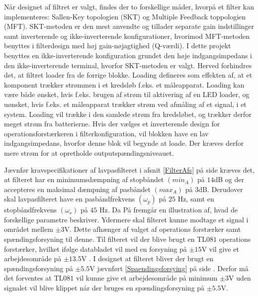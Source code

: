 Når designet af filtret er valgt, findes der to forskellige måder, hvorpå et filter kan implementeres: Sallen-Key topologien (SKT) og Multiple Feedback toppologien (MFT). SKT-metoden er den mest anvendte og tillader separate gain indstillinger samt inverterende og ikke-inverterende konfigurationer, hvorimod MFT-metoden benyttes i filterdesign med høj gain-nøjagtighed (Q-værdi). I dette projekt benyttes en ikke-inverterende konfiguration grundet den høje indgangsimpedans i den ikke-inverterende terminal, hvorfor SKT-metoden er valgt. Herved forhindres det, at filtret loader fra de forrige blokke. Loading defineres som effekten af, at et komponent trækker strømmen i et kredsløb f.eks. et måleapparat. Loading kan være både ønsket, hvis f.eks. brugen af strøm til aktivering af en LED loader, og uønsket, hvis f.eks. et måleapparat trækker strøm ved afmåling af et signal, i et system. Loading vil trække i den samlede strøm fra kredsløbet, og trækker derfor meget strøm fra batterierne. Hvis der vælges et inverterende design for operationsforstærkeren i filterkonfiguration, vil blokken have en lav indgangsimpedans, hvorfor denne blok vil begynde at loade. Der kræves derfor mere strøm for at opretholde outputspændingsniveauet. \cite{Webster2009,Carter2013,Karni2014}

Jævnfør kravspecifikationer af lavpasfilteret i afsnit \ref{FilterAfs} på side \pageref{FilterAfs} kræves det, at filteret har en minimumsdæmpning af stopbåndet $(min_{A})$ på $14$dB og der accepteres en maksimal dæmpning af pasbåndet $(max_{A})$ på $3$dB. Derudover skal lavpasfilteret have en pasbåndfrekvens $(\omega_p)$ på $25$ Hz, samt en stopbåndfrekvens $(\omega_s)$ på $45$ Hz. Da På  fremgår en illustration af, hvad de forskellige parametre beskriver. Ydermere skal filteret kunne modtage et signal i området mellem $\pm3$V. Dette afhænger af valget af operations forstærker samt spændingsforsyning til denne. Til filteret vil der blive brugt en TL$081$ operations forstærker, hvilket ifølge databladet vil med en forsyning på $\pm15$V vil give et arbejdesområde på $\pm13.5$V \cite{Corporation1995}. I designet at filteret bliver der brugt en spændingsforsyning på $\pm5.5$V jævnført \ref{Spaendingsforsying} på side \pageref{Spaendingsforsying}. Derfor må det forventes at TL$081$ vil kunne give et arbejdesområde på  minimum $\pm3$V uden signalet vil blive klippet når der bruges en spændingsforsyning på $\pm5.5$V. 

